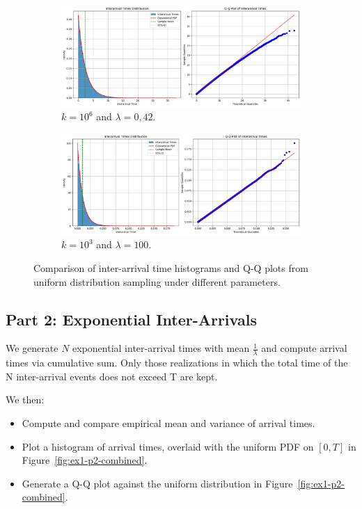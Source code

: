 \documentclass[a4paper,12pt]{article}
\begin{document}
\begin{figure}[htbp]
  \centering
  \begin{subfigure}[b]{0.48\textwidth}
    \centering
    \includegraphics[width=\textwidth]{images/ex1-p1.png}
    \caption{$k = 10^6$ and $\lambda = 0,42$.}\label{fig:ex1-p1}
  \end{subfigure}
  \hfill
  \begin{subfigure}[b]{0.48\textwidth}
    \centering
    \includegraphics[width=\textwidth]{images/ex1-p1-hl.png}
    \caption{$k = 10^3$ and $\lambda = 100$.}\label{fig:ex1-p1-hl}
  \end{subfigure}
  \caption{Comparison of inter-arrival time histograms and Q-Q plots from uniform distribution sampling under different parameters.}\label{fig:ex1-p1-combined}
\end{figure}

\subsection*{Part 2: Exponential Inter-Arrivals}

We generate $N$ exponential inter-arrival times with mean $\frac{1}{\lambda}$ and compute arrival times via cumulative sum. Only those realizations in which the total time of the N inter-arrival events does not exceed T are kept.

We then:

\begin{itemize}
  \item Compute and compare empirical mean and variance of arrival times.
  \item Plot a histogram of arrival times, overlaid with the uniform PDF on $[0, T]$ in Figure~\ref{fig:ex1-p2-combined}.
  \item Generate a Q-Q plot against the uniform distribution in Figure~\ref{fig:ex1-p2-combined}.
\end{itemize}
\end{document}
